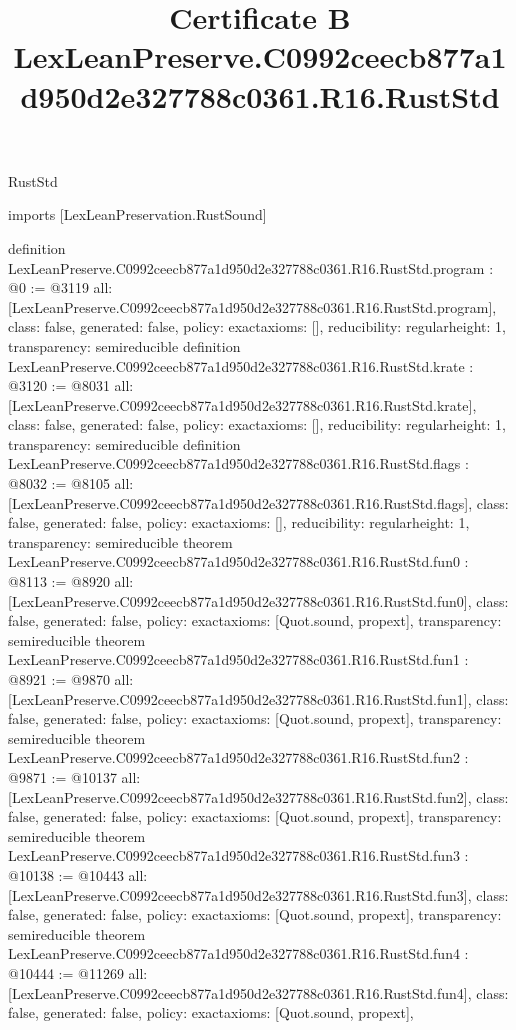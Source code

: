 \begin{lexlean}{RustStd}
\title{Certificate B LexLeanPreserve.C0992ceecb877a1d950d2e327788c0361.R16.RustStd}
\begin{coremodule}
imports [LexLeanPreservation.RustSound]

definition LexLeanPreserve.C0992ceecb877a1d950d2e327788c0361.R16.RustStd.program : @0 := @3119 {
  all: [LexLeanPreserve.C0992ceecb877a1d950d2e327788c0361.R16.RustStd.program],
  class: false,
  generated: false,
  policy: exact{axioms: []},
  reducibility: regular{height: 1},
  transparency: semireducible
}
definition LexLeanPreserve.C0992ceecb877a1d950d2e327788c0361.R16.RustStd.krate : @3120 := @8031 {
  all: [LexLeanPreserve.C0992ceecb877a1d950d2e327788c0361.R16.RustStd.krate],
  class: false,
  generated: false,
  policy: exact{axioms: []},
  reducibility: regular{height: 1},
  transparency: semireducible
}
definition LexLeanPreserve.C0992ceecb877a1d950d2e327788c0361.R16.RustStd.flags : @8032 := @8105 {
  all: [LexLeanPreserve.C0992ceecb877a1d950d2e327788c0361.R16.RustStd.flags],
  class: false,
  generated: false,
  policy: exact{axioms: []},
  reducibility: regular{height: 1},
  transparency: semireducible
}
theorem LexLeanPreserve.C0992ceecb877a1d950d2e327788c0361.R16.RustStd.fun0 : @8113 := @8920 {
  all: [LexLeanPreserve.C0992ceecb877a1d950d2e327788c0361.R16.RustStd.fun0],
  class: false,
  generated: false,
  policy: exact{axioms: [Quot.sound, propext]},
  transparency: semireducible
}
theorem LexLeanPreserve.C0992ceecb877a1d950d2e327788c0361.R16.RustStd.fun1 : @8921 := @9870 {
  all: [LexLeanPreserve.C0992ceecb877a1d950d2e327788c0361.R16.RustStd.fun1],
  class: false,
  generated: false,
  policy: exact{axioms: [Quot.sound, propext]},
  transparency: semireducible
}
theorem LexLeanPreserve.C0992ceecb877a1d950d2e327788c0361.R16.RustStd.fun2 : @9871 := @10137 {
  all: [LexLeanPreserve.C0992ceecb877a1d950d2e327788c0361.R16.RustStd.fun2],
  class: false,
  generated: false,
  policy: exact{axioms: [Quot.sound, propext]},
  transparency: semireducible
}
theorem LexLeanPreserve.C0992ceecb877a1d950d2e327788c0361.R16.RustStd.fun3 : @10138 := @10443 {
  all: [LexLeanPreserve.C0992ceecb877a1d950d2e327788c0361.R16.RustStd.fun3],
  class: false,
  generated: false,
  policy: exact{axioms: [Quot.sound, propext]},
  transparency: semireducible
}
theorem LexLeanPreserve.C0992ceecb877a1d950d2e327788c0361.R16.RustStd.fun4 : @10444 := @11269 {
  all: [LexLeanPreserve.C0992ceecb877a1d950d2e327788c0361.R16.RustStd.fun4],
  class: false,
  generated: false,
  policy: exact{axioms: [Quot.sound, propext]},
}
\end{coremodule}
\end{lexlean}
